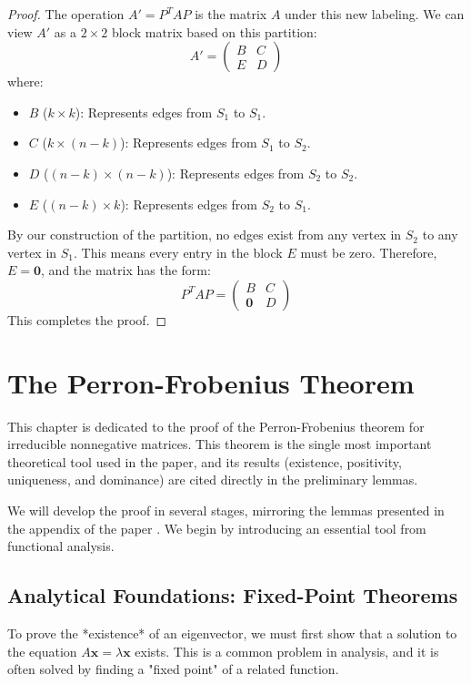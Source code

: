 \documentclass[12pt,a4paper]{report}
\theoremstyle{plain}
\theoremstyle{definition}
\theoremstyle{remark}
\begin{document}
\begin{proof}
The operation $A' = P^T A P$ is the matrix $A$ under this new labeling. We can view $A'$ as a $2 \times 2$ block matrix based on this partition:
$$A' = \begin{pmatrix} B & C \\ E & D \end{pmatrix}$$
where:
\begin{itemize}
    \item $B$ ($k \times k$): Represents edges from $S_1$ to $S_1$.
    \item $C$ ($k \times (n-k)$): Represents edges from $S_1$ to $S_2$.
    \item $D$ ($(n-k) \times (n-k)$): Represents edges from $S_2$ to $S_2$.
    \item $E$ ($(n-k) \times k$): Represents edges from $S_2$ to $S_1$.
\end{itemize}
By our construction of the partition, no edges exist from any vertex in $S_2$ to any vertex in $S_1$. This means every entry in the block $E$ must be zero.
Therefore, $E = \mathbf{0}$, and the matrix has the form:
$$P^T A P = \begin{pmatrix} B & C \\ \mathbf{0} & D \end{pmatrix}$$
This completes the proof.
\end{proof}



\chapter{The Perron-Frobenius Theorem}

This chapter is dedicated to the proof of the Perron-Frobenius theorem for irreducible nonnegative matrices. This theorem is the single most important theoretical tool used in the paper, and its results (existence, positivity, uniqueness, and dominance) are cited directly in the preliminary lemmas.

We will develop the proof in several stages, mirroring the lemmas presented in the appendix of the paper \cite{main_paper}. We begin by introducing an essential tool from functional analysis.

\section{Analytical Foundations: Fixed-Point Theorems}
To prove the *existence* of an eigenvector, we must first show that a solution to the equation $A\bm{x} = \lambda \bm{x}$ exists. This is a common problem in analysis, and it is often solved by finding a "fixed point" of a related function.
\end{document}
